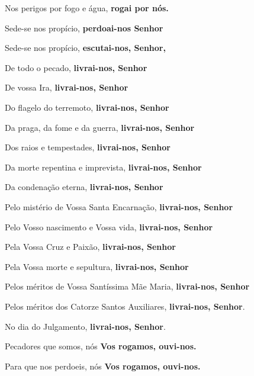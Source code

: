 \documentclass[a4paper,12pt]{extarticle} \usepackage[utf8]{inputenc}
\begin{document}
Nos perigos por fogo e água, \textbf{rogai por nós.}

 

Sede-se nos propício,\textbf{ perdoai-nos Senhor}

 

Sede-se nos propício, \textbf{escutai-nos, Senhor,}

 

De todo o pecado, \textbf{livrai-nos, Senhor}

 

De vossa Ira, \textbf{livrai-nos, Senhor}

 

Do flagelo do terremoto, \textbf{livrai-nos, Senhor}

 

Da praga, da fome e da guerra, \textbf{livrai-nos, Senhor}

 

Dos raios e tempestades, \textbf{livrai-nos, Senhor}

 

Da morte repentina e imprevista, \textbf{livrai-nos, Senhor}

 

Da condenação eterna, \textbf{livrai-nos, Senhor}

 

Pelo mistério de Vossa Santa Encarnação, \textbf{livrai-nos, Senhor}

 

Pelo Vosso nascimento e Vossa vida, \textbf{livrai-nos, Senhor}

 

Pela Vossa Cruz e Paixão, \textbf{livrai-nos, Senhor}

 

Pela Vossa morte e sepultura, \textbf{livrai-nos, Senhor}

 

Pelos méritos de Vossa Santíssima Mãe Maria, \textbf{livrai-nos, Senhor}

 

Pelos méritos dos Catorze Santos Auxiliares,\textbf{ livrai-nos, Senhor}.

 

No dia do Julgamento,\textbf{ livrai-nos, Senhor}.

 

Pecadores que somos, nós \textbf{Vos rogamos, ouvi-nos.}

 

Para que nos perdoeis, nós \textbf{Vos rogamos, ouvi-nos.}
\end{document}
